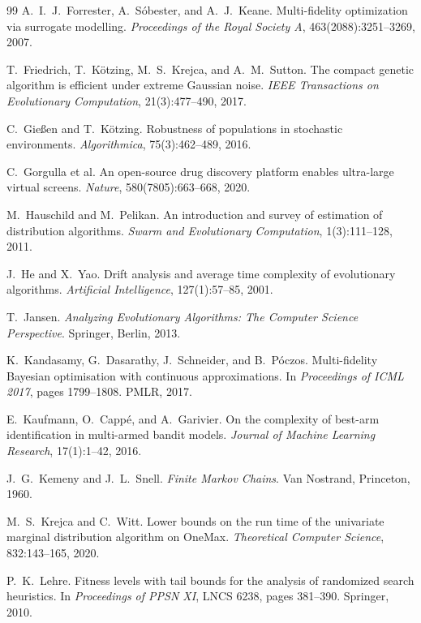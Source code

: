 \documentclass[11pt,a4paper]{article}
\begin{document}
\begin{thebibliography}{99}
A.~I.~J.~Forrester, A.~S\'obester, and A.~J.~Keane.
Multi-fidelity optimization via surrogate modelling.
\textit{Proceedings of the Royal Society A}, 463(2088):3251--3269, 2007.

T.~Friedrich, T.~K\"otzing, M.~S.~Krejca, and A.~M.~Sutton.
The compact genetic algorithm is efficient under extreme Gaussian noise.
\textit{IEEE Transactions on Evolutionary Computation}, 21(3):477--490, 2017.

C.~Gie\ss en and T.~K\"otzing.
Robustness of populations in stochastic environments.
\textit{Algorithmica}, 75(3):462--489, 2016.

C.~Gorgulla et al.
An open-source drug discovery platform enables ultra-large virtual screens.
\textit{Nature}, 580(7805):663--668, 2020.

M.~Hauschild and M.~Pelikan.
An introduction and survey of estimation of distribution algorithms.
\textit{Swarm and Evolutionary Computation}, 1(3):111--128, 2011.

J.~He and X.~Yao.
Drift analysis and average time complexity of evolutionary algorithms.
\textit{Artificial Intelligence}, 127(1):57--85, 2001.

T.~Jansen.
\textit{Analyzing Evolutionary Algorithms: The Computer Science Perspective}.
Springer, Berlin, 2013.

K.~Kandasamy, G.~Dasarathy, J.~Schneider, and B.~P\'oczos.
Multi-fidelity Bayesian optimisation with continuous approximations.
In \textit{Proceedings of ICML 2017}, pages 1799--1808. PMLR, 2017.

E.~Kaufmann, O.~Capp\'e, and A.~Garivier.
On the complexity of best-arm identification in multi-armed bandit models.
\textit{Journal of Machine Learning Research}, 17(1):1--42, 2016.

J.~G.~Kemeny and J.~L.~Snell.
\textit{Finite Markov Chains}.
Van Nostrand, Princeton, 1960.

M.~S.~Krejca and C.~Witt.
Lower bounds on the run time of the univariate marginal distribution algorithm
on OneMax.
\textit{Theoretical Computer Science}, 832:143--165, 2020.

P.~K.~Lehre.
Fitness levels with tail bounds for the analysis of randomized search
heuristics.
In \textit{Proceedings of PPSN XI}, LNCS 6238, pages 381--390. Springer, 2010.


\end{thebibliography}
\end{document}
